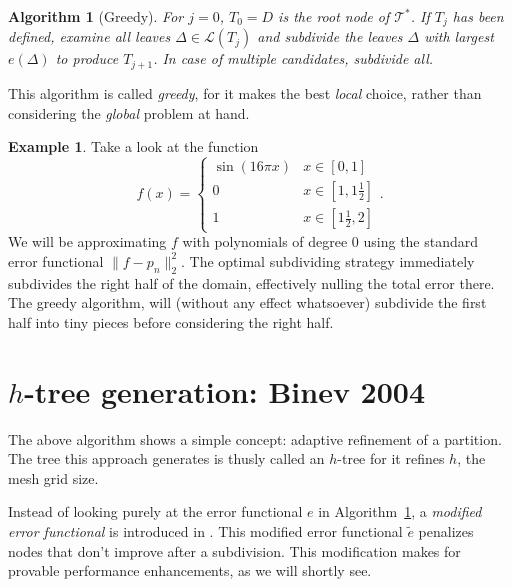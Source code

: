 \documentclass[11pt]{report}
\newtheorem{algorithm}{Algorithm}
\theoremstyle{definition}
\newtheorem*{example}{Example}
\theoremstyle{remark}
\newcommand{\T}{\mathcal{T}}
\renewcommand{\L}{\mathcal{L}}
\newcommand{\node}{\Delta}
\newcommand{\te}{\tilde e}
\begin{document}
\begin{algorithm}[Greedy]
  \label{alggreedy}
  For $j=0$, $T_0 = D$ is the root node of $\T^*$. If $T_j$ has been defined, examine all leaves $\node \in \L(T_j)$ and subdivide the leaves $\node$ with largest $e(\node)$ to produce $T_{j+1}$. In case of multiple candidates, subdivide all.
\end{algorithm}

This algorithm is called \emph{greedy}, for it makes the best \emph{local} choice, rather than considering the \emph{global} problem at hand.

\begin{example}
Take a look at the function
\[
  f(x) = \begin{cases} \sin(16 \pi x) & x \in [0,1] \\ 0 & x \in [1,1\frac{1}{2}] \\ 1 & x \in [1\frac{1}{2},2] \end{cases}.
\]
We will be approximating $f$ with polynomials of degree $0$ using the standard error functional $\|f - p_n\|_2^2$. The optimal subdividing strategy immediately subdivides the right half of the domain, effectively nulling the total error there. The greedy algorithm, will (without any effect whatsoever) subdivide the first half into tiny pieces before considering the right half.
\end{example}

\section{$h$-tree generation: Binev 2004}
The above algorithm shows a simple concept: adaptive refinement of a partition. The tree this approach generates is thusly called an $h$-tree for it refines $h$, the mesh grid size.

Instead of looking purely at the error functional $e$ in Algorithm~\ref{alggreedy}, a \emph{modified error functional} is introduced in \cite{2004}. This modified error functional $\te$ penalizes nodes that don't improve after a subdivision. This modification makes for provable performance enhancements, as we will shortly see.
\end{document}

